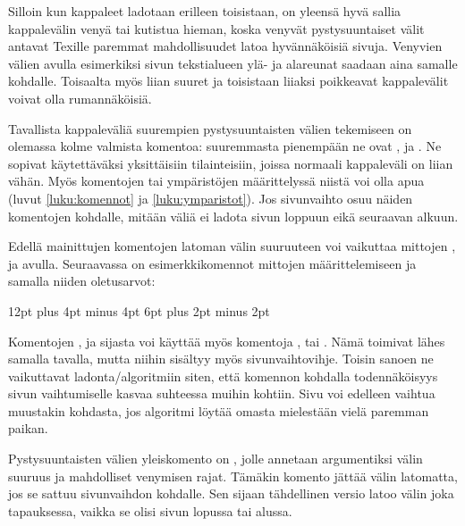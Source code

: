 \begin{koodilohkosis}
  \setlength{\parskip}{1.3ex plus .2ex minus .1ex}
\end{koodilohkosis}

Silloin kun kappaleet ladotaan erilleen toisistaan, on yleensä hyvä
sallia kappalevälin venyä tai kutistua hieman, koska venyvät
pystysuuntaiset välit antavat Texille paremmat mahdollisuudet latoa
hyvännäköisiä sivuja. Venyvien välien avulla esimerkiksi sivun
tekstialueen ylä- ja alareunat saadaan aina samalle kohdalle. Toisaalta
myös liian suuret ja toisistaan liiaksi poikkeavat kappalevälit voivat
olla rumannäköisiä.

Tavallista kappaleväliä suurempien pystysuuntaisten välien tekemiseen on
olemassa kolme valmista komentoa: suuremmasta pienempään ne ovat
,  ja . Ne
sopivat käytettäväksi yksittäisiin tilainteisiin, joissa normaali
kappaleväli on liian vähän. Myös komentojen tai ympäristöjen
määrittelyssä niistä voi olla apua (luvut \ref{luku:komennot} ja
\ref{luku:ymparistot}). Jos sivunvaihto osuu näiden komentojen kohdalle,
mitään väliä ei ladota sivun loppuun eikä seuraavan alkuun.

Edellä mainittujen komentojen latoman välin suuruuteen voi vaikuttaa
mittojen ,  ja
 avulla. Seuraavassa on esimerkkikomennot
mittojen määrittelemiseen ja samalla niiden oletusarvot:

\begin{koodilohkosis}
  \setlength{\bigskipamount} {12pt plus 4pt minus 4pt}
  \setlength{\medskipamount}  {6pt plus 2pt minus 2pt}
  \setlength{\smallskipamount}{3pt plus 1pt minus 1pt}
\end{koodilohkosis}

Komentojen ,  ja 
sijasta voi käyttää myös komentoja ,
 tai . Nämä toimivat lähes
samalla tavalla, mutta niihin sisältyy myös sivunvaihtovihje. Toisin
sanoen ne vaikuttavat ladonta\-/algoritmiin siten, että komennon
kohdalla todennäköisyys sivun vaihtumiselle kasvaa suhteessa muihin
kohtiin. Sivu voi edelleen vaihtua muustakin kohdasta, jos algoritmi
löytää omasta mielestään vielä paremman paikan.

Pystysuuntaisten välien yleiskomento on , jolle
annetaan argumentiksi välin suuruus ja mahdolliset venymisen rajat.
Tämäkin komento jättää välin latomatta, jos se sattuu sivunvaihdon
kohdalle. Sen sijaan tähdellinen versio  latoo välin
joka tapauksessa, vaikka se olisi sivun lopussa tai alussa.

